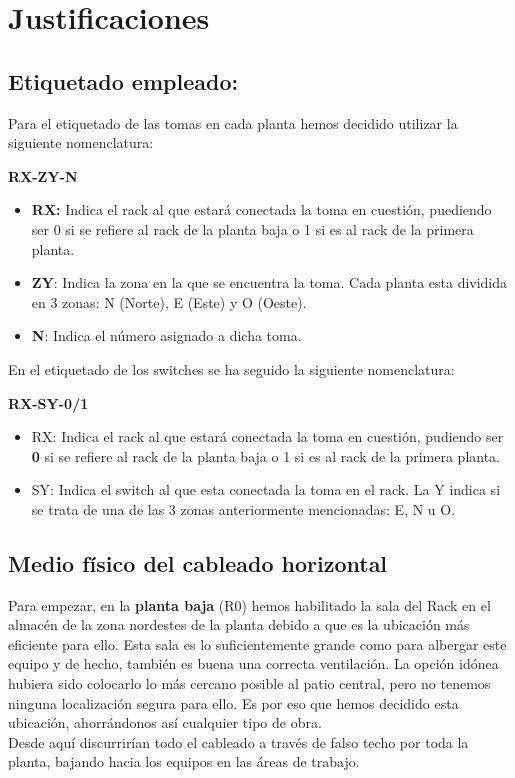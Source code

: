 \section{Justificaciones}
\subsection{\textbf{Etiquetado empleado: }}
Para el etiquetado de las tomas en cada planta hemos decidido utilizar la siguiente nomenclatura:
\begin{center}
    \textbf{RX-ZY-N}
\end{center}

\begin{itemize}
    \item \textbf{RX:} Indica el rack al que estará conectada la toma en cuestión, puediendo ser 0 si se refiere al rack de la planta baja o 1 si es al rack de la primera planta.
    \item \textbf{ZY}: Indica la zona en la que se encuentra la toma. Cada planta esta dividida en 3 zonas: N (Norte), E (Este) y O (Oeste).
    \item \textbf{N}: Indica el número asignado a dicha toma.
\end{itemize}

En el etiquetado de los switches se ha seguido la siguiente nomenclatura:

\begin{center}
    \textbf{RX-SY-0/1}
\end{center}

\begin{itemize}
    \item RX: Indica el rack al que estará conectada la toma en cuestión, pudiendo ser \textbf{0} si se refiere al rack de la planta baja o 1 si es al rack de la primera planta.
    \item SY: Indica el switch al que esta conectada la toma en el rack. La Y indica si se trata de una de las 3 zonas anteriormente mencionadas: E, N u O.
\end{itemize}

\subsection{Medio físico del cableado horizontal}
Para empezar, en la \textbf{planta baja} (R0) hemos habilitado la sala del Rack en el almacén de la zona nordestes de la planta debido a que es la ubicación más eficiente para ello. Esta sala es lo suficientemente grande como para albergar este equipo y de hecho, también es buena una correcta ventilación. La opción idónea hubiera sido colocarlo lo más cercano posible al patio central, pero no tenemos ninguna localización segura para ello. Es por eso que hemos decidido esta ubicación, ahorrándonos así cualquier tipo de obra. \\ Desde aquí discurrirían todo el cableado a través de falso techo por toda la planta, bajando hacia los equipos en las áreas de trabajo.\\

